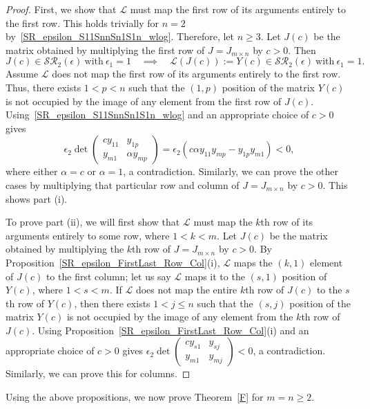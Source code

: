 \documentclass[11pt,reqno]{amsart}
\theoremstyle{plain}
\theoremstyle{definition}
\numberwithin{equation}{section}
\begin{document}
\begin{proof}
	First, we show that $\mathcal{L}$ must map the first row of its arguments entirely to the first row. This holds trivially for $n=2$ by~\eqref{SR_epsilon_S11SnnSn1S1n_wlog}. Therefore, let $n\geq3$. Let $J(c)$ be the matrix obtained by multiplying the first row of $J=J_{m\times n}$ by $c>0$. Then \[J(c)\in \mathcal{SR}_2(\epsilon)~ \text{with}~ \epsilon_1=1\quad \implies \quad \mathcal{L}(J(c)):=Y(c)\in \mathcal{SR}_2(\epsilon)~\text{with}~ \epsilon_1=1. \] 
	Assume $\mathcal{L}$ does not map the first row of its arguments entirely to the first row. Thus, there exists $1<p<n$ such that the $(1,p)$ position of the matrix $Y(c)$ is not occupied by the image of any element from the first row of $J(c)$. Using~\eqref{SR_epsilon_S11SnnSn1S1n_wlog} and an appropriate choice of $c>0$ gives
	\[\epsilon_2\det\begin{pmatrix}
		cy_{11} & y_{1p} \\
		y_{m1} & \alpha y_{mp}
	\end{pmatrix}=\epsilon_2(c\alpha y_{11}y_{mp}-y_{1p}y_{m1})<0,\]
	where either $\alpha=c$ or $\alpha=1$, a contradiction. Similarly, we can prove the other cases by multiplying that particular row and column of $J=J_{m\times n}$ by $c>0$. This shows part (i).
	
	To prove part (ii), we will first show that $\mathcal{L}$ must map the $k$th row of its arguments entirely to some row, where $1<k<m$. Let $J(c)$ be the matrix obtained by multiplying the $k$th row of $J=J_{m\times n}$ by $c> 0$. By Proposition~\ref{SR_epsilon_FirstLast_Row_Col}(i), $\mathcal{L}$ maps the $(k,1)$ element of $J(c)$ to the first column; let us say $\mathcal{L}$ maps it to the $(s,1)$ position of $Y(c)$, where $1<s<m$. If $\mathcal{L}$ does not map the entire $k$th row of $J(c)$ to the $s$th row of $Y(c)$, then there exists $1<j\leq n$ such that the $(s,j)$ position of the matrix $Y(c)$ is not occupied by the image of any element from the $k$th row of $J(c)$. Using Proposition~\ref{SR_epsilon_FirstLast_Row_Col}(i) and an appropriate choice of $c>0$ gives $\epsilon_2\det\begin{pmatrix}
		cy_{s1} & y_{sj} \\
		y_{m1} & y_{mj}
	\end{pmatrix}<0$, a contradiction.
	Similarly, we can prove this for columns. 
\end{proof}
Using the above propositions, we now prove Theorem~\ref{F} for $m=n\geq2$.
\end{document}
